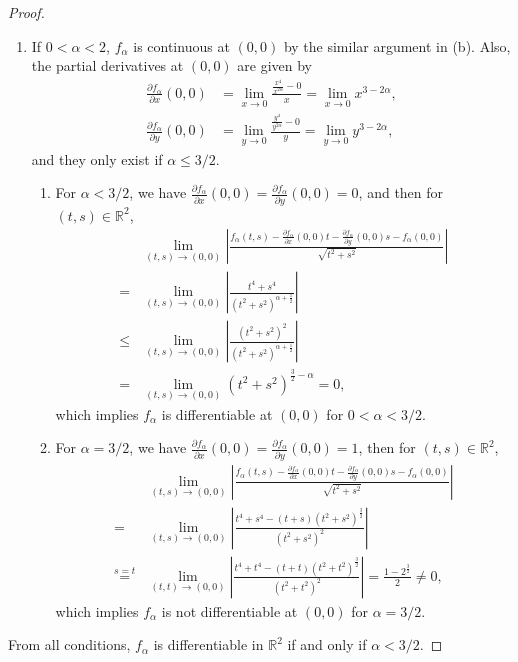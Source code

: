 \documentclass[11pt]{article}
\theoremstyle{definition}
\numberwithin{equation}{subsection}
\begin{document}
\begin{proof}
\begin{enumerate}[label=(\alph*)]
    \item If $0 < \alpha < 2$, $f_{\alpha}$ is continuous at $(0,0)$ by the similar argument in (b). Also, the partial derivatives at $(0,0)$ are given by
    \begin{align*}
        \frac{\partial f_{\alpha}}{\partial x}(0,0) & = \lim_{x\to 0} \frac{\frac{x^4}{x^{2\alpha}} - 0}{x} = \lim_{x\to 0} x^{3 - 2\alpha}, \\
        \frac{\partial f_{\alpha}}{\partial y}(0,0) & = \lim_{y\to 0} \frac{\frac{y^4}{y^{2\alpha}} - 0}{y} = \lim_{y\to 0} y^{3 - 2\alpha},
    \end{align*}
    and they only exist if $\alpha \leq 3/2$. 
    \begin{enumerate}[label=\arabic*)]
        \item For $\alpha < 3/2$, we have $  \frac{\partial f_{\alpha}}{\partial x}(0,0) = \frac{\partial f_{\alpha}}{\partial y}(0,0) = 0$, and then for $(t,s) \in \mathbb{R}^2$, 
        \begin{align*}
            & \lim_{(t,s)\to (0,0)} \left| \frac{f_{\alpha}(t,s) - \frac{\partial f_{\alpha}}{\partial x}(0,0)t - \frac{\partial f_{\alpha}}{\partial y}(0,0)s - f_{\alpha}(0,0)}{\sqrt{t^2 + s^2}} \right| \\
            = & \lim_{(t,s)\to (0,0)} \left| \frac{t^4 + s^4}{(t^2 + s^2)^{\alpha + \frac{1}{2}}} \right| \\
            \leq & \lim_{(t,s)\to (0,0)} \left| \frac{(t^2 + s^2)^2}{(t^2 + s^2)^{\alpha + \frac{1}{2}}} \right| \\
            = & \lim_{(t,s)\to (0,0)} \left(t^2 + s^2\right)^{\frac{3}{2} - \alpha} = 0,
        \end{align*}
        which implies $f_{\alpha}$ is differentiable at $(0,0)$ for $0 < \alpha < 3/2$.
        
        \item For $\alpha = 3/2$, we have $  \frac{\partial f_{\alpha}}{\partial x}(0,0) = \frac{\partial f_{\alpha}}{\partial y}(0,0) = 1$, then for $(t,s) \in \mathbb{R}^2$,
        \begin{align*}
            & \lim_{(t,s)\to (0,0)} \left| \frac{f_{\alpha}(t,s) - \frac{\partial f_{\alpha}}{\partial x}(0,0)t - \frac{\partial f_{\alpha}}{\partial y}(0,0)s - f_{\alpha}(0,0)}{\sqrt{t^2 + s^2}} \right| \\
            = & \lim_{(t,s)\to (0,0)} \left| \frac{t^4 + s^4 - (t+s)(t^2+s^2)^{\frac{3}{2}}}{(t^2+s^2)^2} \right| \\
            \overset{s = t}{=} & \lim_{(t,t)\to (0,0)} \left| \frac{t^4 + t^4 - (t+t)(t^2 + t^2)^{ \frac{3}{2}} }{(t^2 + t^2)^2} \right| = \frac{1 - 2^{\frac{3}{2}}}{2} \neq 0,
        \end{align*}
        which implies $f_{\alpha}$ is not differentiable at $(0,0)$ for $\alpha = 3/2$.
    \end{enumerate}
\end{enumerate}
From all conditions, $f_{\alpha}$ is differentiable in $\mathbb{R}^2$ if and only if $\alpha < 3/2$.
\end{proof}
\end{document}
